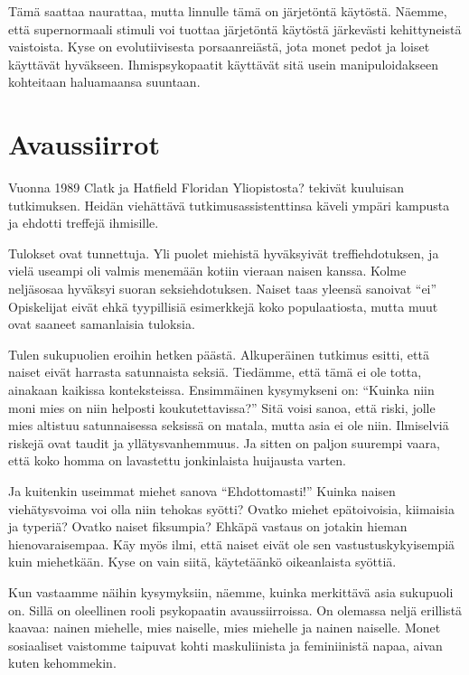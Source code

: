Tämä saattaa naurattaa, mutta linnulle tämä on järjetöntä käytöstä. Näemme, että supernormaali stimuli voi tuottaa järjetöntä käytöstä järkevästi kehittyneistä vaistoista. Kyse on evolutiivisesta porsaanreiästä, jota monet pedot ja loiset käyttävät hyväkseen. Ihmispsykopaatit käyttävät sitä usein manipuloidakseen kohteitaan haluamaansa suuntaan.

\section{Avaussiirrot}

Vuonna 1989 Clatk ja Hatfield Floridan Yliopistosta? tekivät kuuluisan tutkimuksen. Heidän viehättävä tutkimusassistenttinsa käveli ympäri kampusta ja ehdotti treffejä ihmisille.

Tulokset ovat tunnettuja. Yli puolet miehistä hyväksyivät treffiehdotuksen, ja vielä useampi oli valmis menemään kotiin vieraan naisen kanssa. Kolme neljäsosaa hyväksyi suoran seksiehdotuksen. Naiset taas yleensä sanoivat ``ei'' Opiskelijat eivät ehkä tyypillisiä esimerkkejä koko populaatiosta, mutta muut ovat saaneet samanlaisia tuloksia.

Tulen sukupuolien eroihin hetken päästä. Alkuperäinen tutkimus esitti, että naiset eivät harrasta satunnaista seksiä. Tiedämme, että tämä ei ole totta, ainakaan kaikissa konteksteissa. Ensimmäinen kysymykseni on: ``Kuinka niin moni mies on niin helposti koukutettavissa?'' Sitä voisi sanoa, että riski, jolle mies altistuu satunnaisessa seksissä on matala, mutta asia ei ole niin. Ilmiselviä riskejä ovat taudit ja yllätysvanhemmuus. Ja sitten on paljon suurempi vaara, että koko homma on lavastettu jonkinlaista huijausta varten.

Ja kuitenkin useimmat miehet sanova ``Ehdottomasti!'' Kuinka naisen viehätysvoima voi olla niin tehokas syötti? Ovatko miehet epätoivoisia, kiimaisia ja typeriä? Ovatko naiset fiksumpia? Ehkäpä vastaus on jotakin hieman hienovaraisempaa. Käy myös ilmi, että naiset eivät ole sen vastustuskykyisempiä kuin miehetkään. Kyse on vain siitä, käytetäänkö oikeanlaista syöttiä.

Kun vastaamme näihin kysymyksiin, näemme, kuinka merkittävä asia sukupuoli on. Sillä on oleellinen rooli psykopaatin avaussiirroissa. On olemassa neljä erillistä kaavaa: nainen miehelle, mies naiselle, mies miehelle ja nainen naiselle. Monet sosiaaliset vaistomme taipuvat kohti maskuliinista ja feminiinistä napaa, aivan kuten kehommekin.

